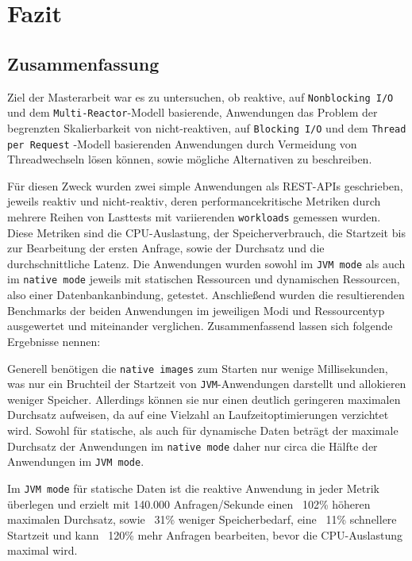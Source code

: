 \section{Fazit}
\label{sec:fazit}

\subsection{Zusammenfassung}
\label{subsec:zusammenfassung}
Ziel der Masterarbeit war es zu untersuchen, ob reaktive, auf \verb|Nonblocking I/O| und dem \verb|Multi-Reactor|-Modell basierende,
Anwendungen das Problem der begrenzten Skalierbarkeit von nicht-reaktiven, auf \verb|Blocking I/O| und dem \verb|Thread per Request|
-Modell basierenden Anwendungen durch Vermeidung von Threadwechseln lösen können, sowie mögliche Alternativen zu beschreiben.

Für diesen Zweck wurden zwei simple Anwendungen als REST-APIs geschrieben, jeweils reaktiv und nicht-reaktiv, deren
performancekritische Metriken durch mehrere Reihen von Lasttests mit variierenden \verb|workloads| gemessen wurden.
Diese Metriken sind die CPU-Auslastung, der Speicherverbrauch, die Startzeit bis zur Bearbeitung der ersten Anfrage,
sowie der Durchsatz und die durchschnittliche Latenz.
Die Anwendungen wurden sowohl im \verb|JVM mode| als auch im \verb|native mode| jeweils mit statischen Ressourcen und dynamischen
Ressourcen, also einer Datenbankanbindung, getestet.
Anschließend wurden die resultierenden Benchmarks der beiden Anwendungen im jeweiligen Modi und Ressourcentyp ausgewertet und
miteinander verglichen.
\newline
Zusammenfassend lassen sich folgende Ergebnisse nennen:\newline

Generell benötigen die \verb|native images| zum Starten nur wenige Millisekunden, was nur ein Bruchteil der Startzeit
von \verb|JVM|-Anwendungen darstellt und allokieren weniger Speicher. Allerdings können sie nur einen deutlich
geringeren maximalen Durchsatz aufweisen, da auf eine Vielzahl an Laufzeitoptimierungen verzichtet wird.
Sowohl für statische, als auch für dynamische Daten beträgt der maximale Durchsatz der Anwendungen im \verb|native mode|
daher nur circa die Hälfte der Anwendungen im \verb|JVM mode|.

Im \verb|JVM mode| für statische Daten ist die reaktive Anwendung in jeder Metrik überlegen und erzielt mit 140.000 Anfragen/Sekunde
einen ~102\% höheren maximalen Durchsatz, sowie ~31\% weniger Speicherbedarf, eine ~11\% schnellere Startzeit und kann ~120\%
mehr Anfragen bearbeiten, bevor die CPU-Auslastung maximal wird.


